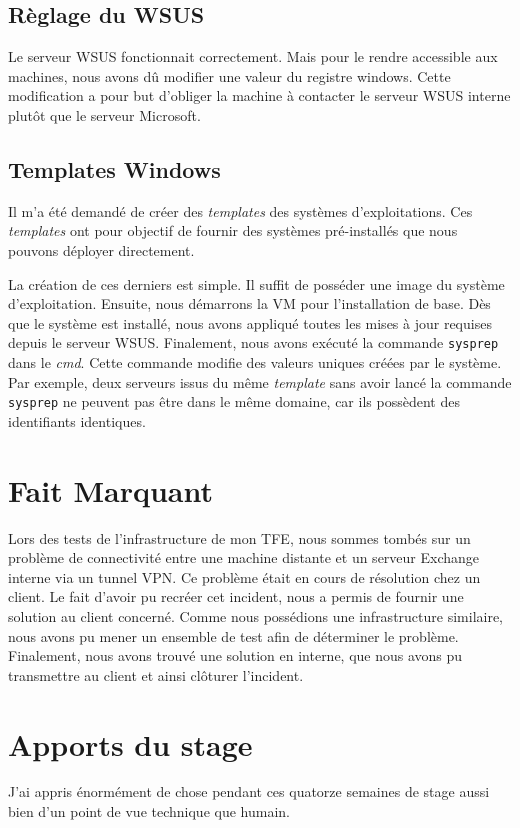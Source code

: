 \subsection{Règlage du WSUS}
Le serveur WSUS fonctionnait correctement.
Mais pour le rendre accessible aux machines, nous avons dû modifier une valeur du registre windows.
Cette modification a pour but d'obliger la machine à contacter le serveur WSUS interne plutôt que le serveur Microsoft. 

\subsection{Templates Windows}
Il m'a été demandé de créer des \textit{templates} des systèmes d'exploitations.
Ces \textit{templates} ont pour objectif de fournir des systèmes pré-installés que nous pouvons déployer directement.

La création de ces derniers est simple. 
Il suffit de posséder une image du système d'exploitation.
Ensuite, nous démarrons la VM pour l'installation de base. 
Dès que le système est installé, nous avons appliqué toutes les mises à jour requises depuis le serveur WSUS. 
Finalement, nous avons exécuté la commande \texttt{sysprep} dans le \textit{cmd}.
Cette commande modifie des valeurs uniques créées par le système.
Par exemple, deux serveurs issus du même \textit{template} sans avoir lancé la commande \texttt{sysprep} ne peuvent pas être dans le même domaine, car ils possèdent des identifiants identiques. 

\section{Fait Marquant}
Lors des tests de l'infrastructure de mon TFE, nous sommes tombés sur un problème de connectivité entre une machine distante et un serveur Exchange interne via un tunnel VPN. 
Ce problème était en cours de résolution chez un client.
Le fait d'avoir pu recréer cet incident, nous a permis de fournir une solution au client concerné. 
Comme nous possédions une infrastructure similaire, nous avons pu mener un ensemble de test afin de déterminer le problème.
Finalement, nous avons trouvé une solution en interne, que nous avons pu transmettre au client et ainsi clôturer l'incident.

\section{Apports du stage}
J'ai appris énormément de chose pendant ces quatorze semaines de stage aussi bien d'un point de vue technique que humain.

